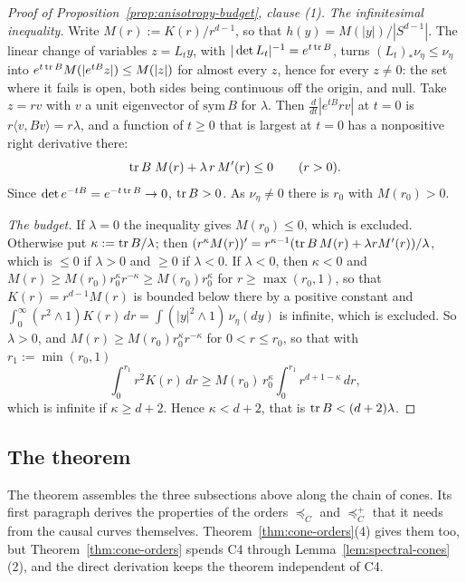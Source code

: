 \begin{proof}[Proof of Proposition~\ref{prop:anisotropy-budget}, clause (1)]
\emph{The infinitesimal inequality.} Write $M(r) := K(r)/r^{d-1}$, so that $h(y) = M(|y|)/|S^{d-1}|$.
The linear change of variables $z = L_ty$, with $|\det L_t|^{-1} = e^{t\operatorname{tr} B}$, turns
$(L_t)_*\nu_\eta \le \nu_\eta$ into $e^{t\operatorname{tr} B}M(|e^{tB}z|) \le M(|z|)$ for almost every $z$, hence for
every $z \ne 0$: the set where it fails is open, both sides being continuous off the origin, and
null. Take $z = rv$ with $v$ a unit eigenvector of $\mathrm{sym}\,B$ for $\lambda$. Then
$\tfrac{d}{dt}|e^{tB}rv|$ at $t = 0$ is $r\langle v,Bv\rangle = r\lambda$, and a function of $t \ge 0$
that is largest at $t = 0$ has a nonpositive right derivative there:
\[
  \operatorname{tr} B\;M(r) + \lambda\,r\,M'(r) \le 0 \qquad (r > 0).
\]
Since $\det e^{-tB} = e^{-t\operatorname{tr} B} \to 0$, $\operatorname{tr} B > 0$. As $\nu_\eta \ne 0$ there is $r_0$ with
$M(r_0) > 0$.

\emph{The budget.} If $\lambda = 0$ the inequality gives $M(r_0) \le 0$, which is excluded. Otherwise
put $\kappa := \operatorname{tr} B/\lambda$; then $(r^\kappa M(r))' = r^{\kappa-1}(\operatorname{tr} B\,M(r) + \lambda rM'(r))/\lambda$,
which is $\le 0$ if $\lambda > 0$ and $\ge 0$ if $\lambda < 0$. If $\lambda < 0$, then $\kappa < 0$ and
$M(r) \ge M(r_0)r_0^\kappa r^{-\kappa} \ge M(r_0)r_0^\kappa$ for $r \ge \max(r_0, 1)$, so that
$K(r) = r^{d-1}M(r)$ is bounded below there by a positive constant and
$\int_0^\infty(r^2 \wedge 1)K(r)\,dr = \int(|y|^2 \wedge 1)\,\nu_\eta(dy)$ is infinite, which is excluded.
So $\lambda > 0$, and $M(r) \ge M(r_0)r_0^\kappa r^{-\kappa}$ for $0 < r \le r_0$, so that with
$r_1 := \min(r_0, 1)$
\[
  \int_0^{r_1}r^2K(r)\,dr \ge M(r_0)\,r_0^\kappa\int_0^{r_1}r^{d+1-\kappa}\,dr ,
\]
which is infinite if $\kappa \ge d+2$. Hence $\kappa < d + 2$, that is $\operatorname{tr} B < (d+2)\lambda$.
\end{proof}

\subsection{The theorem}\label{app:wedge-axis-theorem}

The theorem assembles the three subsections above along the chain of cones.
Its first paragraph derives the properties of the orders $\preceq_C$ and $\preceq^+_C$ that it needs
from the causal curves themselves. Theorem~\ref{thm:cone-orders}(4) gives them too, but
Theorem~\ref{thm:cone-orders} spends C4 through Lemma~\ref{lem:spectral-cones}(2), and the direct
derivation keeps the theorem independent of C4.

